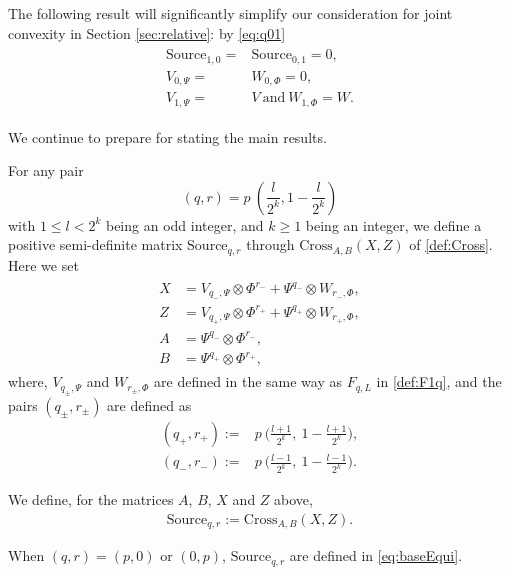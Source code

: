 \documentclass{article}
\numberwithin{equation}{section}
\begin{document}
The following result will significantly simplify our consideration for joint convexity in Section \ref{sec:relative}:
by \eqref{eq:q01}
\begin{align}\label{eq:p1}
\begin{split}
\text{Source}_{1,0} =& \text{Source}_{0,1}=0, \\ 
V_{0,\Psi} =& W_{0,\Phi} = 0,\\
V_{1,\Psi} =& V\ \text{and}\ W_{1,\Phi} = W.
\end{split}
\end{align}


We continue to prepare for stating the main results. 

For any pair
\begin{equation}\label{eq:pairQR}
(q, r) = p\ ( \frac{l}{2^{k}}, 1 - \frac{l}{2^{k}} )
\end{equation}
with $1 \le l < 2^{k}$ being an odd integer, and $k\geq 1$ being an integer, we define a positive semi-definite matrix
$\text{Source}_{q,r}$ through $\text{Cross}_{A,B}(X,Z)$ of \eqref{def:Cross}. Here we set
\begin{align}\label{eq:ABXZ}
\begin{split}
X &= V_{q_- ,\Psi} \otimes \Phi^{r_-} + \Psi^{q_-} \otimes W_{r_-, \Phi} ,\\
Z &= V_{q_+, \Psi} \otimes \Phi^{r_+} + \Psi^{q_+} \otimes W_{r_+, \Phi},\\
A &= \Psi^{q_-} \otimes \Phi^{r_-} ,\\
B &= \Psi^{q_+} \otimes \Phi^{r_+},
\end{split}
\end{align}
where, $V_{q_\pm ,\Psi}$ and $W_{r_\pm, \Phi}$ are defined in the same way as $F_{q,L}$ in \eqref{def:F1q}, and the pairs $(q_{\pm},r_{\pm})$ are defined as
\begin{align*}
(q_+, r_+) :=& p \ \big( \frac{l+1}{2^{k}},\  1 - \frac{l+1}{2^{k}}  \big),\\ 
(q_{-}, r_{-}) :=& p\ \big( \frac{l-1}{2^{k}},\   1 - \frac{l-1}{2^{k}} \big).
\end{align*}

We define, for the matrices $A$, $B$, $X$ and $Z$ above,
\begin{align}\label{def:sourceQR}
\text{Source}_{q,r}
    :=\text{Cross}_{A,B}(X,Z).
\end{align}

When $(q,r)=(p,0)$ or $(0,p)$, $\text{Source}_{q,r}$ are defined in \eqref{eq:baseEqui}. 
\end{document}
